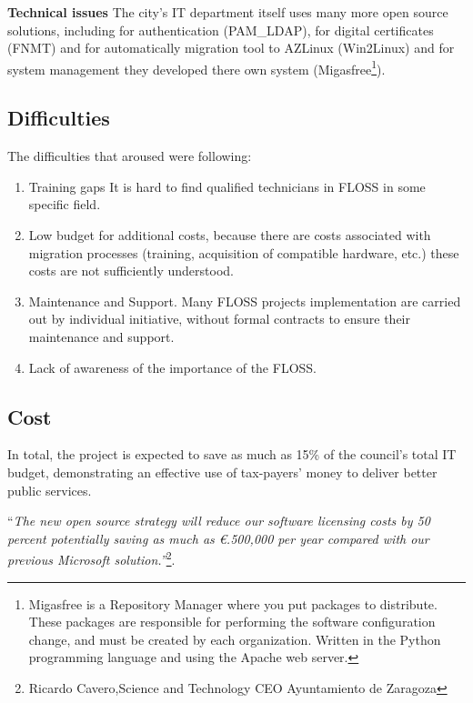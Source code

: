 \textbf{Technical issues}
The city's IT department itself uses many more open source solutions, including for authentication (PAM\_LDAP), for digital certificates (FNMT) and for automatically migration tool to AZLinux (Win2Linux) and for system management they developed there own system (Migasfree\footnote{Migasfree is a Repository Manager where you put packages to distribute. These packages are responsible for performing the software configuration change, and must be created by each organization. Written in the Python programming language and using the Apache web server.}).

\subsection{Difficulties}

The difficulties that aroused were following:

\begin{enumerate}
\item Training gaps
It is hard to find qualified technicians in FLOSS in some specific field.
\item Low budget for additional costs, because there are costs associated with migration processes (training, acquisition of compatible hardware, etc.) these costs are not sufficiently understood.
\item Maintenance and Support. Many FLOSS projects implementation are carried out by individual initiative, without formal contracts to ensure their maintenance and support.
\item Lack of awareness of the importance of the FLOSS.
\end{enumerate}


\subsection{Cost}
In total, the project is expected to save as much as 15\% of the council's total IT budget, demonstrating an effective use of tax-payers' money to deliver better public services.

``\textit{The new open source strategy will reduce our software licensing costs by 50 percent potentially saving as much as \euro.500,000  per
year compared with our previous Microsoft solution.''}\footnote{Ricardo Cavero,Science and Technology CEO
Ayuntamiento de Zaragoza}.

\newpage

